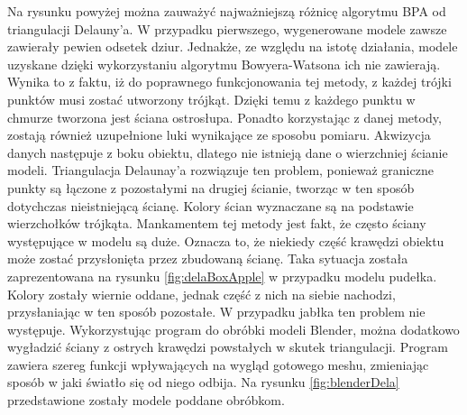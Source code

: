 Na rysunku powyżej można zauważyć najważniejszą różnicę algorytmu BPA od triangulacji Delauny'a. W przypadku pierwszego, wygenerowane modele zawsze zawierały pewien odsetek dziur. Jednakże, ze względu na istotę działania, modele uzyskane dzięki wykorzystaniu algorytmu Bowyera-Watsona ich nie zawierają. Wynika to z faktu, iż do poprawnego funkcjonowania tej metody, z każdej trójki punktów musi zostać utworzony trójkąt. Dzięki temu z każdego punktu w chmurze tworzona jest ściana ostrosłupa. Ponadto korzystając z danej metody, zostają również uzupełnione luki wynikające ze sposobu pomiaru. Akwizycja danych następuje z boku obiektu, dlatego nie istnieją dane o wierzchniej ścianie modeli. Triangulacja Delaunay'a rozwiązuje ten problem, ponieważ graniczne punkty są łączone z pozostałymi na drugiej ścianie, tworząc w ten sposób dotychczas nieistniejącą ścianę. Kolory ścian wyznaczane są na podstawie wierzchołków trójkąta. 
\newline \indent Mankamentem tej metody jest fakt, że często ściany występujące w modelu są duże. Oznacza to, że niekiedy część krawędzi obiektu może zostać przysłonięta przez zbudowaną ścianę. Taka sytuacja została zaprezentowana na rysunku \ref{fig:delaBoxApple} w przypadku modelu pudełka. Kolory zostały wiernie oddane, jednak część z nich na siebie nachodzi, przysłaniając w ten sposób pozostałe. W przypadku jabłka ten problem nie występuje.
\newline \indent Wykorzystując program do obróbki modeli Blender, można dodatkowo wygładzić ściany z ostrych krawędzi powstałych w skutek triangulacji. Program zawiera szereg funkcji wpływających na wygląd gotowego meshu, zmieniając sposób w jaki światło się od niego odbija. Na rysunku \ref{fig:blenderDela} przedstawione zostały modele poddane obróbkom.

